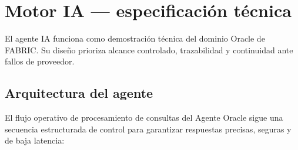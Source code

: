 \documentclass[11pt,letterpaper]{article}
\begin{document}
\section{Motor IA — especificación técnica}

El agente IA funciona como demostración técnica del dominio Oracle de FABRIC. Su diseño prioriza alcance controlado, trazabilidad y continuidad ante fallos de proveedor.

\subsection{Arquitectura del agente}

El flujo operativo de procesamiento de consultas del Agente Oracle sigue una secuencia estructurada de control para garantizar respuestas precisas, seguras y de baja latencia:
\end{document}
